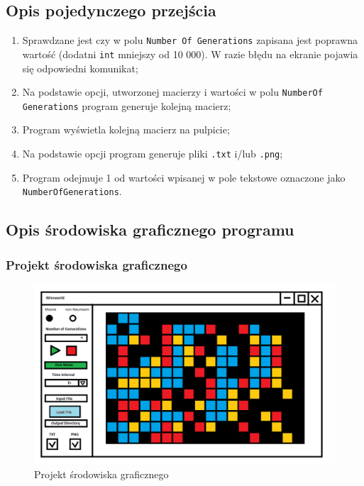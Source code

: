 \documentclass[a4paper,12pt]{article}
\begin{document}
\subsection{Opis pojedynczego przejścia}
\begin{enumerate}
\item Sprawdzane jest czy w polu \texttt{Number Of Generations} zapisana jest popraw\-na wartość (dodatni \texttt{int} mniejszy od 10 000). W razie błędu na ekranie pojawia się odpowiedni komunikat;
\item Na podstawie opcji, utworzonej macierzy i wartości w polu \texttt{NumberOf \linebreak Generations} program generuje kolejną macierz;
\item Program wyświetla kolejną macierz na pulpicie;
\item Na podstawie opcji program generuje pliki \texttt{.txt} i/lub \texttt{.png};
\item Program odejmuje 1 od wartości wpisanej w pole tekstowe oznaczone jako \texttt{NumberOfGenerations}.
\end{enumerate}

\subsection{Opis środowiska graficznego programu}
\subsubsection{Projekt środowiska graficznego}
\begin{figure}[H]
	\centering
	\includegraphics[scale=0.6]{ProjektGUI.png}
	\caption{Projekt środowiska graficznego}
\end{figure}
\newpage
\end{document}
